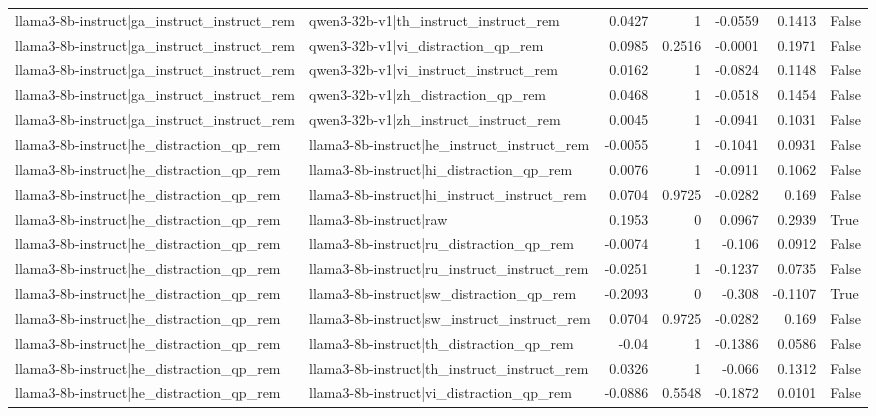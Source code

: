 \begin{table}
\begin{tabular}{l l r r r r l}
llama3-8b-instruct|ga_instruct_instruct_rem & qwen3-32b-v1|th_instruct_instruct_rem & 0.0427 & 1 & -0.0559 & 0.1413 & False \\
llama3-8b-instruct|ga_instruct_instruct_rem & qwen3-32b-v1|vi_distraction_qp_rem & 0.0985 & 0.2516 & -0.0001 & 0.1971 & False \\
llama3-8b-instruct|ga_instruct_instruct_rem & qwen3-32b-v1|vi_instruct_instruct_rem & 0.0162 & 1 & -0.0824 & 0.1148 & False \\
llama3-8b-instruct|ga_instruct_instruct_rem & qwen3-32b-v1|zh_distraction_qp_rem & 0.0468 & 1 & -0.0518 & 0.1454 & False \\
llama3-8b-instruct|ga_instruct_instruct_rem & qwen3-32b-v1|zh_instruct_instruct_rem & 0.0045 & 1 & -0.0941 & 0.1031 & False \\
llama3-8b-instruct|he_distraction_qp_rem & llama3-8b-instruct|he_instruct_instruct_rem & -0.0055 & 1 & -0.1041 & 0.0931 & False \\
llama3-8b-instruct|he_distraction_qp_rem & llama3-8b-instruct|hi_distraction_qp_rem & 0.0076 & 1 & -0.0911 & 0.1062 & False \\
llama3-8b-instruct|he_distraction_qp_rem & llama3-8b-instruct|hi_instruct_instruct_rem & 0.0704 & 0.9725 & -0.0282 & 0.169 & False \\
llama3-8b-instruct|he_distraction_qp_rem & llama3-8b-instruct|raw & 0.1953 & 0 & 0.0967 & 0.2939 & True \\
llama3-8b-instruct|he_distraction_qp_rem & llama3-8b-instruct|ru_distraction_qp_rem & -0.0074 & 1 & -0.106 & 0.0912 & False \\
llama3-8b-instruct|he_distraction_qp_rem & llama3-8b-instruct|ru_instruct_instruct_rem & -0.0251 & 1 & -0.1237 & 0.0735 & False \\
llama3-8b-instruct|he_distraction_qp_rem & llama3-8b-instruct|sw_distraction_qp_rem & -0.2093 & 0 & -0.308 & -0.1107 & True \\
llama3-8b-instruct|he_distraction_qp_rem & llama3-8b-instruct|sw_instruct_instruct_rem & 0.0704 & 0.9725 & -0.0282 & 0.169 & False \\
llama3-8b-instruct|he_distraction_qp_rem & llama3-8b-instruct|th_distraction_qp_rem & -0.04 & 1 & -0.1386 & 0.0586 & False \\
llama3-8b-instruct|he_distraction_qp_rem & llama3-8b-instruct|th_instruct_instruct_rem & 0.0326 & 1 & -0.066 & 0.1312 & False \\
llama3-8b-instruct|he_distraction_qp_rem & llama3-8b-instruct|vi_distraction_qp_rem & -0.0886 & 0.5548 & -0.1872 & 0.0101 & False \\

\end{tabular}
\end{table}
